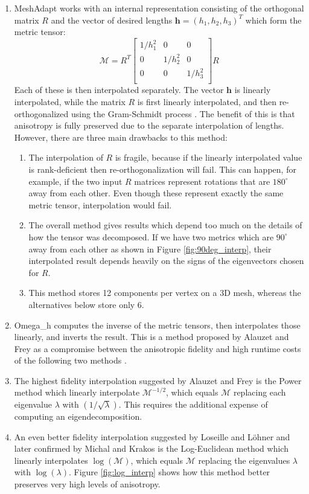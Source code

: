 \begin{enumerate}
\item MeshAdapt works with an internal representation consisting
of the orthogonal matrix $R$ and the vector of desired lengths
$\mathbf{h} = (h_1, h_2, h_3)^T$ which form the metric tensor:
\begin{equation}
\mathcal{M} = R^T \begin{bmatrix}
1 / h_1^2 & 0 & 0 \\
0 & 1 / h_2^2 & 0 \\
0 & 0 & 1 / h_3^2 \\
\end{bmatrix} R
\end{equation}
Each of these is then interpolated separately.
The vector $\mathbf{h}$ is linearly interpolated, while the
matrix $R$ is first linearly interpolated, and then re-orthogonalized
using the Gram-Schmidt process \cite{trefethen1997numerical}.
The benefit of this is that anisotropy is fully preserved due to the
separate interpolation of lengths.
However, there are three main drawbacks to this method:
\begin{enumerate}
\item The interpolation of $R$ is fragile, because if the linearly
interpolated value is rank-deficient then re-orthogonalization
will fail. This can happen, for example, if the two input $R$ matrices
represent rotations that are $180^{\circ}$ away from each other.
Even though these represent exactly the same metric tensor, interpolation
would fail.
\item The overall method gives results which depend too much on the
details of how the tensor was decomposed.
If we have two metrics which are $90^{\circ}$ away from each other
as shown in Figure \ref{fig:90deg_interp},
their interpolated result depends heavily on the signs of the eigenvectors
chosen for $R$.
\item This method stores 12 components per vertex on a 3D mesh, whereas
the alternatives below store only 6.
\end{enumerate}
\item Omega\_h computes the inverse of the metric tensors, then
interpolates those linearly, and inverts the result.
This is a method proposed by Alauzet and Frey as a compromise between
the anisotropic fidelity and high runtime costs of the following two methods
\cite{alauzet2003estimateur}.
\item The highest fidelity interpolation suggested by Alauzet and Frey is
the Power method which linearly interpolate $\mathcal{M}^{-1/2}$,
which equals $\mathcal{M}$ replacing each eigenvalue $\lambda$
with $(1/\sqrt{\lambda})$.
This requires the additional expense of computing an eigendecomposition.
\item An even better fidelity interpolation suggested by Loseille and
L{\"o}hner \cite{loseille20093d} and later confirmed by
Michal and Krakos \cite{michal2012anisotropic} is the Log-Euclidean
method which linearly interpolates $\log(\mathcal{M})$, which equals
$\mathcal{M}$ replacing the eigenvalues $\lambda$ with $\log(\lambda)$.
Figure \ref{fig:log_interp} shows how this method better preserves
very high levels of anisotropy.
\end{enumerate}

